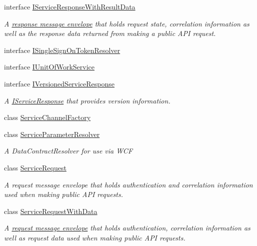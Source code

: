\begin{DoxyCompactItemize}
interface \hyperlink{interfaceCqrs_1_1Services_1_1IServiceResponseWithResultData}{I\+Service\+Response\+With\+Result\+Data}
\begin{DoxyCompactList}\small\item\em A \hyperlink{interfaceCqrs_1_1Services_1_1IServiceResponse}{response message envelope} that holds request state, correlation information as well as the response data returned from making a public A\+PI request. \end{DoxyCompactList}\item 
interface \hyperlink{interfaceCqrs_1_1Services_1_1ISingleSignOnTokenResolver}{I\+Single\+Sign\+On\+Token\+Resolver}
\item 
interface \hyperlink{interfaceCqrs_1_1Services_1_1IUnitOfWorkService}{I\+Unit\+Of\+Work\+Service}
\item 
interface \hyperlink{interfaceCqrs_1_1Services_1_1IVersionedServiceResponse}{I\+Versioned\+Service\+Response}
\begin{DoxyCompactList}\small\item\em A \hyperlink{interfaceCqrs_1_1Services_1_1IServiceResponse}{I\+Service\+Response} that provides version information. \end{DoxyCompactList}\item 
class \hyperlink{classCqrs_1_1Services_1_1ServiceChannelFactory}{Service\+Channel\+Factory}
\item 
class \hyperlink{classCqrs_1_1Services_1_1ServiceParameterResolver}{Service\+Parameter\+Resolver}
\begin{DoxyCompactList}\small\item\em A Data\+Contract\+Resolver for use via W\+CF \end{DoxyCompactList}\item 
class \hyperlink{classCqrs_1_1Services_1_1ServiceRequest}{Service\+Request}
\begin{DoxyCompactList}\small\item\em A request message envelope that holds authentication and correlation information used when making public A\+PI requests. \end{DoxyCompactList}\item 
class \hyperlink{classCqrs_1_1Services_1_1ServiceRequestWithData}{Service\+Request\+With\+Data}
\begin{DoxyCompactList}\small\item\em A \hyperlink{}{request message envelope} that holds authentication, correlation information as well as request data used when making public A\+PI requests. \end{DoxyCompactList}\item 

\end{DoxyCompactItemize}
